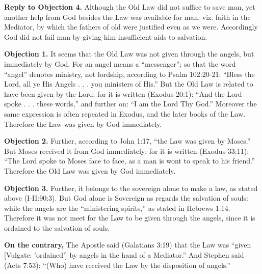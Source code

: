 \textbf{Reply to Objection 4.} Although the Old Law did not suffice to save man, yet another help from God besides the Law was available for man, viz. faith in the Mediator, by which the fathers of old were justified even as we were. Accordingly God did not fail man by giving him insufficient aids to salvation.


\textbf{Objection 1.} It seems that the Old Law was not given through the angels, but immediately by God. For an angel means a ``messenger''; so that the word ``angel'' denotes ministry, not lordship, according to Psalm 102:20-21: ``Bless the Lord, all ye His Angels . . . you ministers of His.'' But the Old Law is related to have been given by the Lord: for it is written (Exodus 20:1): ``And the Lord spoke . . . these words,'' and further on: ``I am the Lord Thy God.'' Moreover the same expression is often repeated in Exodus, and the later books of the Law. Therefore the Law was given by God immediately.

\textbf{Objection 2.} Further, according to John 1:17, ``the Law was given by Moses.'' But Moses received it from God immediately: for it is written (Exodus 33:11): ``The Lord spoke to Moses face to face, as a man is wont to speak to his friend.'' Therefore the Old Law was given by God immediately.

\textbf{Objection 3.} Further, it belongs to the sovereign alone to make a law, as stated above (I-II:90:3). But God alone is Sovereign as regards the salvation of souls: while the angels are the ``ministering spirits,'' as stated in Hebrews 1:14. Therefore it was not meet for the Law to be given through the angels, since it is ordained to the salvation of souls.

\textbf{On the contrary,} The Apostle said (Galatians 3:19) that the Law was ``given [Vulgate: 'ordained'] by angels in the hand of a Mediator.'' And Stephen said (Acts 7:53): ``(Who) have received the Law by the disposition of angels.''

